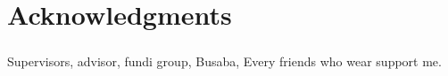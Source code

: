 \documentclass[../main/thesis_msc.tex]{subfiles}
\begin{document}
    \chapter*{Acknowledgments}
    \thispagestyle{plain}

    \paragraph{} Supervisors, advisor, fundi group, Busaba, Every friends who wear support me. 

    \newpage
    \mbox{}
    \thispagestyle{empty}
\end{document}
